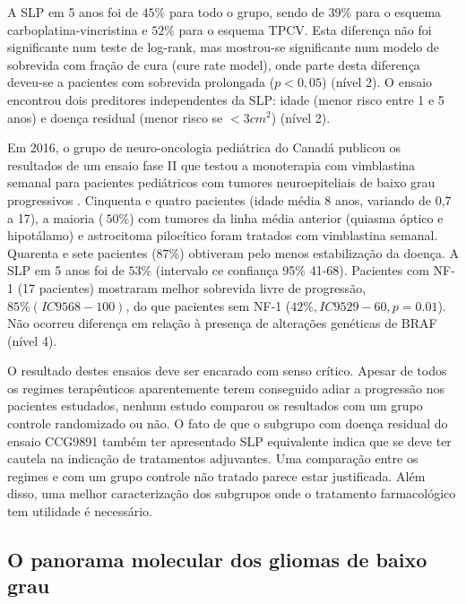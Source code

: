 \documentclass[11pt,a4paper,oldfontcommands]{memoir}
\begin{document}
A SLP em 5 anos foi de \(45\%\) para todo o grupo, sendo de \(39\%\) para o esquema carboplatina-vincristina e \(52\%\) para o esquema TPCV. Esta diferença não foi significante num teste de log-rank, mas mostrou-se significante num modelo de sobrevida com fração de cura (cure rate model), onde parte desta diferença deveu-se a pacientes com sobrevida prolongada (\(p<0,05\)) (nível 2). O ensaio encontrou dois preditores independentes da SLP: idade (menor risco entre 1 e 5 anos) e doença residual (menor risco se \(<3 cm^2\)) (nível 2).

Em 2016, o grupo de neuro-oncologia pediátrica do Canadá publicou os resultados de um ensaio fase II que testou a monoterapia com vimblastina semanal para pacientes pediátricos com tumores neuroepiteliais de baixo grau progressivos \cite{lassaletta}. Cinquenta e quatro pacientes (idade média 8 anos, variando de 0,7 a 17), a maioria (\(~ 50\%\)) com tumores da linha média anterior (quiasma óptico e hipotálamo) e astrocitoma pilocítico foram tratados com vimblastina semanal. Quarenta e sete pacientes (\(87\%\)) obtiveram pelo menos estabilização da doença. A SLP em 5 anos foi de \(53\%\) (intervalo ce confiança 95\% 41-68). Pacientes com NF-1 (17 pacientes) mostraram melhor sobrevida livre de progressão, \(85\% (IC95 68-100)\), do que pacientes sem NF-1 (\(42\%, IC95 29-60, p = 0.01\)). Não ocorreu diferença em relação à presença de alterações genéticas de BRAF (nível 4).

O resultado destes ensaios deve ser encarado com senso crítico. Apesar de todos os regimes terapêuticos aparentemente terem conseguido adiar a progressão nos pacientes estudados, nenhum estudo comparou os resultados com um grupo controle randomizado ou não. O fato de que o subgrupo com doença residual do ensaio CCG9891 também ter apresentado SLP equivalente indica que se deve ter cautela na indicação de tratamentos adjuvantes. Uma comparação entre os regimes e com um grupo controle não tratado parece estar justificada. Além disso, uma melhor caracterização dos subgrupos onde o tratamento farmacológico tem utilidade é necessário.

\subsection{O panorama molecular dos gliomas de baixo grau}
\end{document}
